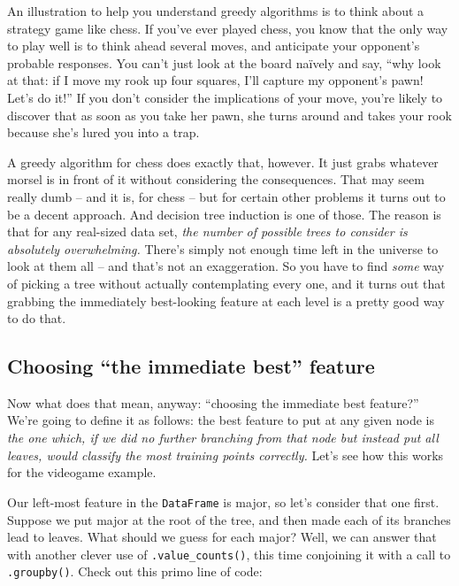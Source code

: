 
An illustration to help you understand greedy algorithms is to think about a
strategy game like chess. If you've ever played chess, you know that the only
way to play well is to think ahead several moves, and anticipate your
opponent's probable responses. You can't just look at the board na\"{i}vely and
say, ``why look at that: if I move my rook up four squares, I'll capture my
opponent's pawn! Let's do it!'' If you don't consider the implications of your
move, you're likely to discover that as soon as you take her pawn, she turns
around and takes your rook because she's lured you into a trap.

A greedy algorithm for chess does exactly that, however. It just grabs whatever
morsel is in front of it without considering the consequences. That may seem
really dumb -- and it is, for chess -- but for certain other problems it turns
out to be a decent approach. And decision tree induction is one of those. The
reason is that for any real-sized data set, \textit{the number of possible
trees to consider is absolutely overwhelming.} There's simply not enough time
left in the universe to look at them all -- and that's not an exaggeration. So
you have to find \textit{some} way of picking a tree without actually
contemplating every one, and it turns out that grabbing the immediately
best-looking feature at each level is a pretty good way to do that.

\subsection{Choosing ``the immediate best'' feature}

Now what does that mean, anyway: ``choosing the immediate best feature?'' We're
going to define it as follows: the best feature to put at any given node is
\textit{the one which, if we did no further branching from that node but
instead put all leaves, would classify the most training points correctly.}
Let's see how this works for the videogame example.


Our left-most feature in the \texttt{DataFrame} is \textsf{major}, so let's
consider that one first. Suppose we put \textsf{major} at the root of the tree,
and then made each of its branches lead to leaves. What should we guess for
each major? Well, we can answer that with another clever use of
\texttt{.value\_counts()}, this time conjoining it with a call to
\texttt{.groupby()}. Check out this primo line of code:

